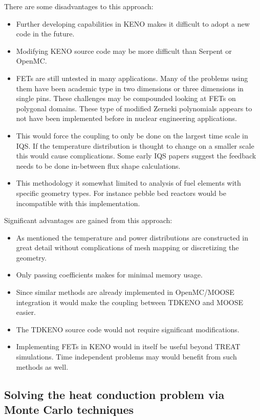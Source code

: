 \documentclass[11pt]{article}
\begin{document}
 
There are some disadvantages to this approach:
	\begin{itemize}
	\item Further developing capabilities in KENO makes it difficult to adopt a new code in the future.
	\item Modifying KENO source code may be more difficult than Serpent or OpenMC.
	\item FETs are still untested in many applications.  Many of the problems using them have been academic type in two dimensions or three dimensions in single pins.  These challenges may be compounded looking at FETs on polygonal domains.  These type of modified Zerneki polynomials  appears to not have been implemented before in nuclear engineering applications. 
	\item This would force the coupling to only be done on the largest time scale in IQS.  If the temperature distribution is thought to change on a smaller scale this would cause complications.  Some early IQS papers suggest the feedback needs to be done in-between flux shape calculations. 
	\item This methodology it somewhat limited to analysis of fuel elements with specific geometry types.  For instance pebble bed reactors would be incompatible with this implementation.
	\end{itemize}

Significant advantages are gained from this approach:
	\begin{itemize}
	\item As mentioned the temperature and power distributions are constructed in great detail without complications of mesh mapping or discretizing the geometry.
	\item Only passing coefficients makes for minimal memory usage.
	\item Since similar methods are already implemented in  OpenMC/MOOSE integration it would make the coupling between TDKENO and MOOSE easier. 
	\item The TDKENO source code would not require significant modifications. 
	\item Implementing FETs in KENO would in itself be useful beyond TREAT simulations.  Time independent problems may would benefit from such methods as well. 
	\end{itemize}


\subsection{Solving the heat conduction problem via Monte Carlo techniques}
\end{document}

